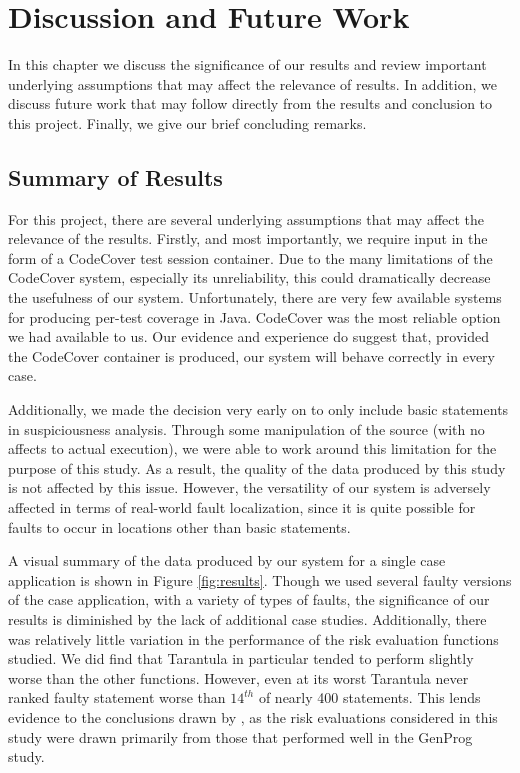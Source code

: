 %
%
%

\chapter{Discussion and Future Work}\label{ch:conclusion}

In this chapter we discuss the significance of our results and review
important underlying assumptions that may affect the relevance of results.
In addition, we discuss future work that may follow directly from the 
results and conclusion to this project.  Finally, we give our brief
concluding remarks.

\section{Summary of Results}\label{sec:summ}

For this project, there are several underlying assumptions that may affect
the relevance of the results.  Firstly, and most importantly, we require
input in the form of a CodeCover test session container.  Due to the many
limitations of the CodeCover system, especially its unreliability, this 
could dramatically decrease the usefulness of our system.  Unfortunately,
there are very few available systems for producing per-test coverage in
Java.  CodeCover was the most reliable option we had available to us.  Our
evidence and experience do suggest that, provided the CodeCover container
is produced, our system will behave correctly in every case.

Additionally, we made the decision very early on to only include basic
statements in suspiciousness analysis.  Through some manipulation of the
source (with no affects to actual execution), we were able to work around
this limitation for the purpose of this study.  As a result, the quality
of the data produced by this study is not affected by this issue.  However,
the versatility of our system is adversely affected in terms of real-world
fault localization, since it is quite possible for faults to occur in
locations other than basic statements.  

A visual summary of the data produced by our
system for a single case application is shown in Figure \ref{fig:results}.  Though we used several faulty
versions of the case application, with a variety of types of faults, the
significance of our results is diminished by the lack of additional case
studies.  Additionally, there was relatively little variation in the performance
of the risk evaluation functions studied.  We did find that Tarantula in
particular tended to perform slightly worse than the other functions.  However,
even at its worst Tarantula never ranked faulty statement worse than $14^{th}$ of
nearly 400 statements.  This lends evidence to the conclusions drawn by \cite{genprog},
as the risk evaluations considered in this study were drawn primarily from those
that performed well in the GenProg study.

